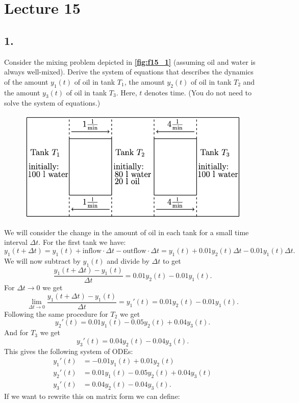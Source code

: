 \section*{Lecture 15}

\subsection*{1.} Consider the mixing problem depicted in \textbf{\autoref{fig:f15_1}} (assuming oil and water is always well-mixed). Derive the system of equations that describes the dynamics of the amount $y_1(t)$ of oil in tank $T_1$, the amount $y_2(t)$ of oil in tank $T_2$ and the amount $y_3(t)$ of oil in tank $T_3$. Here, $t$ denotes time. (You do not need to solve the system of equations.)
\begin{figure} [ht]
  \centering
  \caption{}
  \includegraphics[width=0.5\linewidth]{../figures/f15_1.png}
  \label{fig:f15_1}
\end{figure}
\bigbreak
We will consider the change in the amount of oil in each tank for a small time interval $\Delta t$. For the first tank we have:
\[ 
y_1(t+\Delta t) = y_1(t) + \text{inflow} \cdot \Delta t - \text{outflow} \cdot \Delta t = y_1(t) + \num{0,01} y_2(t) \Delta t - \num{0,01} y_1(t) \Delta t
.\]
We will now subtract by $y_1(t)$ and divide by $\Delta t$ to get
\[ 
\frac{y_1 (t + \Delta t) - y_1(t)}{\Delta t} = \num{0,01} y_2(t) - \num{0,01} y_1(t)
.\]
For $\Delta t \to 0$ we get
\[ 
\lim_{\Delta t \to 0} \frac{y_1 (t + \Delta t) - y_1(t)}{\Delta t} = y_1'(t) = \num{0,01} y_2(t) - \num{0,01} y_1(t)
.\]
Following the same procedure for $T_2$ we get
\[ 
y_2'(t) = \num{0,01} y_1(t) - \num{0,05} y_2(t) + \num{0,04} y_3(t)
.\]
And for $T_3$ we get
\[ 
y_3'(t) = \num{0,04} y_2(t) - \num{0,04} y_3(t)
.\]
This gives the following system of ODEs:
\begin{align*}
  y_1'(t) &= -\num{0,01} y_1(t) + \num{0,01} y_2(t) \\
  y_2'(t) &= \num{0,01} y_1(t) - \num{0,05} y_2(t) + \num{0,04} y_3(t) \\
  y_3'(t) &= \num{0,04} y_2(t) - \num{0,04} y_3(t)
.\end{align*}
If we want to rewrite this on matrix form we can define:
